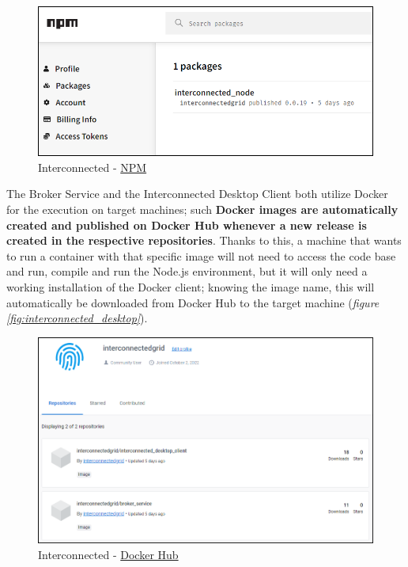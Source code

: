 \begin{figure}[!ht]
    \centering
    \includegraphics[scale=0.45]{document/chapters/chapter_6/images/interconnected_npm.png}
    \caption{Interconnected - \href{https://www.npmjs.com/package/interconnected_node}{NPM}}
    \label{fig:interconnected_npm}
\end{figure}

The Broker Service and the Interconnected Desktop Client both utilize Docker for the execution on target machines; such \textbf{Docker images are automatically created and published on Docker Hub whenever a new release is created in the respective repositories}. Thanks to this, a machine that wants to run a container with that specific image will not need to access the code base and run, compile and run the Node.js environment, but it will only need a working installation of the Docker client; knowing the image name, this will automatically be downloaded from Docker Hub to the target machine (\textit{figure \ref{fig:interconnected_desktop}}). 

\begin{figure}[!ht]
    \centering
    \includegraphics[width=\linewidth]{document/chapters/chapter_6/images/interconnected_dockerhub.png}
    \caption{Interconnected - \href{https://hub.docker.com/u/interconnectedgrid}{Docker Hub}}
    \label{fig:interconnected_dockerhub}
\end{figure}

